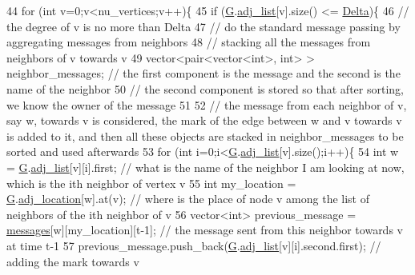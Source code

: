\begin{DoxyCode}
44     \textcolor{keywordflow}{for} (\textcolor{keywordtype}{int} v=0;v<nu\_vertices;v++)\{
45       \textcolor{keywordflow}{if} (\hyperlink{classgraph__message_abffce6d6a7868da0e747425569759f0f}{G}.\hyperlink{classmarked__graph_a1a0bf7ca413a278763f7c878b3b6fd6f}{adj\_list}[v].size() <= \hyperlink{classgraph__message_a45dfd061b7bc73572e5132fbf66efd55}{Delta})\{
46         \textcolor{comment}{// the degree of v is no more than Delta}
47         \textcolor{comment}{// do the standard message passing by aggregating messages from neighbors}
48         \textcolor{comment}{// stacking all the messages from neighbors of v towards v}
49         vector<pair<vector<int>, \textcolor{keywordtype}{int}> > neighbor\_messages; \textcolor{comment}{// the first component is the message and the
       second is the name of the neighbor}
50         \textcolor{comment}{// the second component is stored so that after sorting, we know the owner of the message}
51 
52         \textcolor{comment}{// the message from each neighbor of v, say w,  towards v is considered, the mark of the edge
       between w and v towards v is added to it, and then all these objects are stacked in neighbor\_messages to be
       sorted and used afterwards }
53         \textcolor{keywordflow}{for} (\textcolor{keywordtype}{int} i=0;i<\hyperlink{classgraph__message_abffce6d6a7868da0e747425569759f0f}{G}.\hyperlink{classmarked__graph_a1a0bf7ca413a278763f7c878b3b6fd6f}{adj\_list}[v].size();i++)\{
54           \textcolor{keywordtype}{int} w = \hyperlink{classgraph__message_abffce6d6a7868da0e747425569759f0f}{G}.\hyperlink{classmarked__graph_a1a0bf7ca413a278763f7c878b3b6fd6f}{adj\_list}[v][i].first; \textcolor{comment}{// what is the name of the neighbor I am looking at now,
       which is the ith neighbor of vertex v }
55           \textcolor{keywordtype}{int} my\_location = \hyperlink{classgraph__message_abffce6d6a7868da0e747425569759f0f}{G}.\hyperlink{classmarked__graph_a3ae722ea9583ad23af34d789a88ac01a}{adj\_location}[w].at(v); \textcolor{comment}{// where is the place of node v among the
       list of neighbors of the ith neighbor of v}
56           vector<int> previous\_message = \hyperlink{classgraph__message_a06a1d1ab91b4891c65ea80205566f800}{messages}[w][my\_location][t-1]; \textcolor{comment}{// the message sent from
       this neighbor towards v at time t-1}
57           previous\_message.push\_back(\hyperlink{classgraph__message_abffce6d6a7868da0e747425569759f0f}{G}.\hyperlink{classmarked__graph_a1a0bf7ca413a278763f7c878b3b6fd6f}{adj\_list}[v][i].second.first); \textcolor{comment}{// adding the mark towards v
}
\end{DoxyCode}

